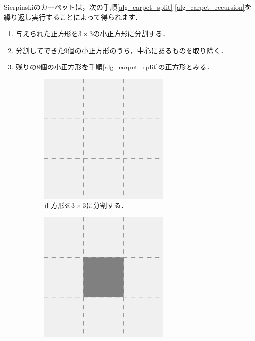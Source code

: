 \documentclass[dvipdfmx]{jsarticle}
\theoremstyle{definition}
\newcommand{\enumproc}{\setlength{\leftskip}{2em}}
\begin{document}
Sierpinskiのカーペットは，次の手順\ref{alg_carpet_split}-\ref{alg_carpet_recursion}を繰り返し実行することによって得られます．
\begin{enumerate}
    \enumproc
    \item 与えられた正方形を$3 \times 3$の小正方形に分割する．
        \label{alg_carpet_split}
    \item 分割してできた9個の小正方形のうち，中心にあるものを取り除く．
        \label{alg_carpet_remove}
    \item 残りの8個の小正方形を手順\ref{alg_carpet_split}の正方形とみる．
        \label{alg_carpet_recursion}
\end{enumerate}
%
\begin{figure}[H]
    \centering
    \begin{subfigure}{0.325\textwidth}
        \centering
        \includegraphics[width=0.7\textwidth]{figure/carpet/carpet_1_split.png}
        \caption{正方形を$3 \times 3$に分割する．}
    \end{subfigure}
    \begin{subfigure}{0.325\textwidth}
        \centering
        \includegraphics[width=0.7\textwidth]{figure/carpet/carpet_1_fill.png}

\end{subfigure}
\end{figure}
\end{document}
